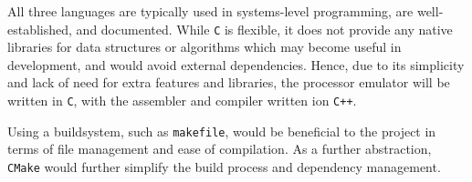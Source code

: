 \documentclass{article}
\begin{document}
    All three languages are typically used in systems-level programming, are well-established, and documented.
    While \texttt{C} is flexible, it does not provide any native libraries for data structures or algorithms which may become useful in development, and would avoid external dependencies.
    Hence, due to its simplicity and lack of need for extra features and libraries, the processor emulator will be written in \texttt{C}, with the assembler and compiler written ion \texttt{C++}.

    Using a buildsystem, such as \texttt{makefile}, would be beneficial to the project in terms of file management and ease of compilation.
    As a further abstraction, \texttt{CMake} would further simplify the build process and dependency management.

%
%
%
%
\end{document}
